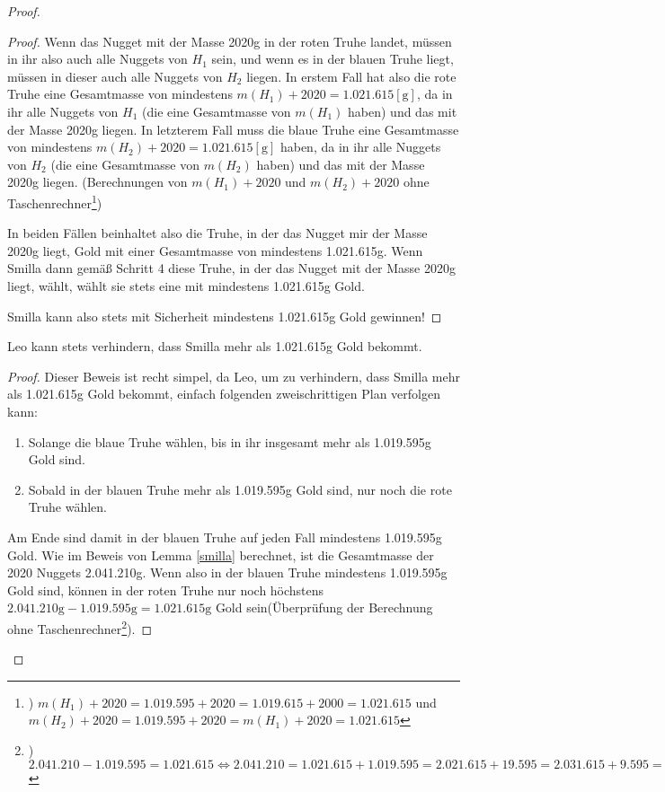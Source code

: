 \begin{proof}
\begin{proof}
        Wenn das Nugget mit der Masse 2020g in der roten Truhe landet, müssen in ihr also auch alle Nuggets von $H_1$ 
        sein, und wenn es in der blauen Truhe liegt, müssen in dieser auch alle Nuggets von $H_2$ liegen. In erstem 
        Fall hat also die rote Truhe eine Gesamtmasse von mindestens $m(H_1)+2020=1.021.615 [\text{g}]$, da in ihr 
        alle Nuggets von $H_1$ (die eine Gesamtmasse von $m(H_1)$ haben) und das mit der Masse 2020g liegen. In 
        letzterem Fall muss die blaue Truhe eine Gesamtmasse von mindestens $m(H_2)+2020=1.021.615 [\text{g}]$ haben,
        da in ihr alle Nuggets von $H_2$ (die eine Gesamtmasse von $m(H_2)$ haben) und das mit der Masse 2020g 
        liegen. (Berechnungen von $m(H_1)+2020$ und $m(H_2)+2020$ ohne Taschenrechner\footnote{) $m(H_1)+2020=
        1.019.595+2020=1.019.615+2000=1.021.615$ und $m(H_2)+2020=1.019.595+2020=m(H_1)+2020=1.021.615$})

        In beiden Fällen beinhaltet also die Truhe, in der das Nugget mir der Masse 2020g liegt, Gold mit einer 
        Gesamtmasse von mindestens 1.021.615g. Wenn Smilla dann gemäß Schritt 4 diese Truhe, in der das Nugget mit 
        der Masse 2020g liegt, wählt, wählt sie stets eine mit mindestens 1.021.615g Gold.

        Smilla kann also stets mit Sicherheit mindestens 1.021.615g Gold gewinnen!
    \end{proof}
    \begin{lem}\label{leo}
        Leo kann stets verhindern, dass Smilla mehr als 1.021.615g Gold bekommt.
    \end{lem}
    \begin{proof}
        Dieser Beweis ist recht simpel, da Leo, um zu verhindern, dass Smilla mehr als 1.021.615g Gold bekommt, 
        einfach folgenden zweischrittigen Plan verfolgen kann:
        \begin{enumerate}
            \item Solange die blaue Truhe wählen, bis in ihr insgesamt mehr als 1.019.595g Gold sind.
            \item Sobald in der blauen Truhe mehr als 1.019.595g Gold sind, nur noch die rote Truhe wählen.
        \end{enumerate}
        Am Ende sind damit in der blauen Truhe auf jeden Fall mindestens 1.019.595g Gold. Wie im Beweis von Lemma 
        \ref{smilla} berechnet, ist die Gesamtmasse der 2020 Nuggets 2.041.210g. Wenn also in der blauen Truhe 
        mindestens 1.019.595g Gold sind, können in der roten Truhe nur noch höchstens $2.041.210\text{g}-1.019.595
        \text{g}=1.021.615\text{g}$ Gold sein(Überprüfung der Berechnung ohne Taschenrechner\footnote{) $2.041.210-
        1.019.595=1.021.615\Leftrightarrow 2.041.210=1.021.615+1.019.595=2.021.615+19.595=2.031.615+9.595=2.040.615
        +595=2.041.115+95=2.041.210$}).


\end{proof}
\end{proof}
